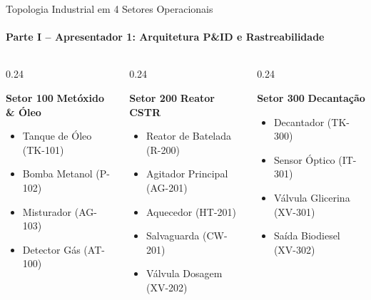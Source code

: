 \documentclass[aspectratio=169, 10pt]{beamer}
\begin{document}
\begin{frame}{Topologia Industrial em 4 Setores Operacionais}
  \framesubtitle{Parte I -- Apresentador 1: Arquitetura P\&ID e Rastreabilidade}
  \begin{columns}[t]
    \begin{column}{0.24\textwidth}
      \begin{block}{\textbf{Setor 100}}
        \scriptsize
        \textbf{Metóxido \& Óleo}
        \begin{itemize}
          \item Tanque de Óleo (TK-101)
          \item Bomba Metanol (P-102)
          \item Misturador (AG-103)
          \item Detector Gás (AT-100)
        \end{itemize}
      \end{block}
    \end{column}
    \begin{column}{0.24\textwidth}
      \begin{block}{\textbf{Setor 200}}
        \scriptsize
        \textbf{Reator CSTR}
        \begin{itemize}
          \item Reator de Batelada (R-200)
          \item Agitador Principal (AG-201)
          \item Aquecedor (HT-201)
          \item Salvaguarda (CW-201)
          \item Válvula Dosagem (XV-202)
        \end{itemize}
      \end{block}
    \end{column}
    \begin{column}{0.24\textwidth}
      \begin{block}{\textbf{Setor 300}}
        \scriptsize
        \textbf{Decantação}
        \begin{itemize}
          \item Decantador (TK-300)
          \item Sensor Óptico (IT-301)
          \item Válvula Glicerina (XV-301)
          \item Saída Biodiesel (XV-302)
        \end{itemize}
      \end{block}
    \end{column}

\end{columns}
\end{frame}
\end{document}
